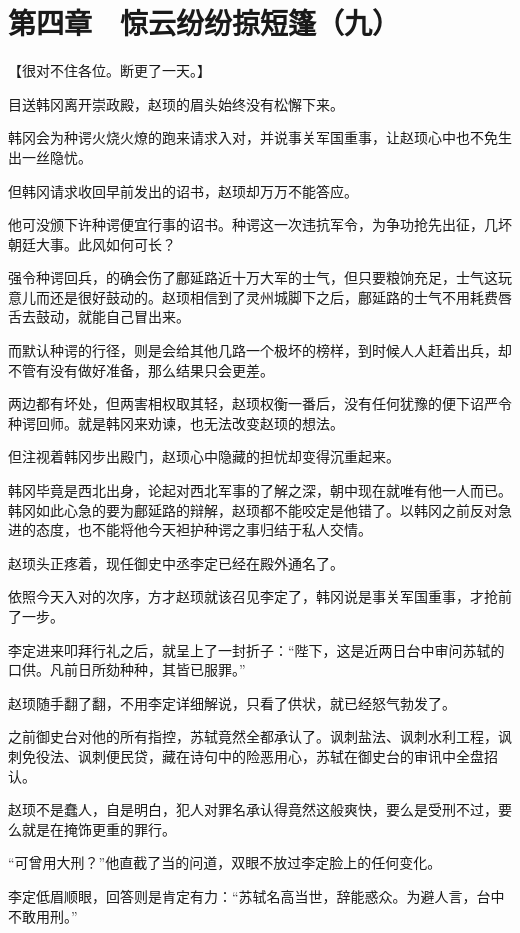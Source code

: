 \section{第四章　惊云纷纷掠短篷（九）}

【很对不住各位。断更了一天。】

目送韩冈离开崇政殿，赵顼的眉头始终没有松懈下来。

韩冈会为种谔火烧火燎的跑来请求入对，并说事关军国重事，让赵顼心中也不免生出一丝隐忧。

但韩冈请求收回早前发出的诏书，赵顼却万万不能答应。

他可没颁下许种谔便宜行事的诏书。种谔这一次违抗军令，为争功抢先出征，几坏朝廷大事。此风如何可长？

强令种谔回兵，的确会伤了鄜延路近十万大军的士气，但只要粮饷充足，士气这玩意儿而还是很好鼓动的。赵顼相信到了灵州城脚下之后，鄜延路的士气不用耗费唇舌去鼓动，就能自己冒出来。

而默认种谔的行径，则是会给其他几路一个极坏的榜样，到时候人人赶着出兵，却不管有没有做好准备，那么结果只会更差。

两边都有坏处，但两害相权取其轻，赵顼权衡一番后，没有任何犹豫的便下诏严令种谔回师。就是韩冈来劝谏，也无法改变赵顼的想法。

但注视着韩冈步出殿门，赵顼心中隐藏的担忧却变得沉重起来。

韩冈毕竟是西北出身，论起对西北军事的了解之深，朝中现在就唯有他一人而已。韩冈如此心急的要为鄜延路的辩解，赵顼都不能咬定是他错了。以韩冈之前反对急进的态度，也不能将他今天袒护种谔之事归结于私人交情。

赵顼头正疼着，现任御史中丞李定已经在殿外通名了。

依照今天入对的次序，方才赵顼就该召见李定了，韩冈说是事关军国重事，才抢前了一步。

李定进来叩拜行礼之后，就呈上了一封折子：“陛下，这是近两日台中审问苏轼的口供。凡前日所劾种种，其皆已服罪。”

赵顼随手翻了翻，不用李定详细解说，只看了供状，就已经怒气勃发了。

之前御史台对他的所有指控，苏轼竟然全都承认了。讽刺盐法、讽刺水利工程，讽刺免役法、讽刺便民贷，藏在诗句中的险恶用心，苏轼在御史台的审讯中全盘招认。

赵顼不是蠢人，自是明白，犯人对罪名承认得竟然这般爽快，要么是受刑不过，要么就是在掩饰更重的罪行。

“可曾用大刑？”他直截了当的问道，双眼不放过李定脸上的任何变化。

李定低眉顺眼，回答则是肯定有力：“苏轼名高当世，辞能惑众。为避人言，台中不敢用刑。”

